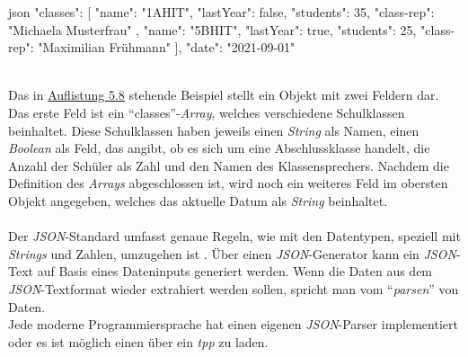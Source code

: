 		\begin{code}{json}
		{
			"classes": [
				{
					"name": "1AHIT",
					"lastYear": false,
					"students": 35,
					"class-rep": "Michaela Musterfrau"
				},
				{
					"name": "5BHIT",
					"lastYear": true,
					"students": 25,
					"class-rep": "Maximilian Frühmann"
				}
			],
			"date": "2021-09-01"
		}
		\end{code}
		\label{code:json}~\\
		Das in \hyperref[code:json]{Auflistung 5.8} stehende Beispiel stellt ein Objekt mit zwei Feldern dar. Das erste Feld ist ein \enquote{classes}-\textit{Array}, welches verschiedene Schulklassen beinhaltet. Diese Schulklassen haben jeweils einen \textit{String} als Namen, einen \textit{Boolean} als Feld, das angibt, ob es sich um eine Abschlussklasse handelt, die Anzahl der Schüler als Zahl und den Namen des Klassensprechers. Nachdem die Definition des \textit{Arrays} abgeschlossen ist, wird noch ein weiteres Feld im obersten Objekt angegeben, welches das aktuelle Datum als \textit{String} beinhaltet.
		\\~\\
		Der \textit{JSON}-Standard umfasst genaue Regeln, wie mit den Datentypen, speziell mit \textit{Strings} und Zahlen, umzugehen ist \cite{rfc4627}.
		Über einen \textit{JSON}-Generator kann ein \textit{JSON}-Text auf Basis eines Dateninputs generiert werden. Wenn die Daten aus dem \textit{JSON}-Textformat wieder extrahiert werden sollen, spricht man vom \enquote{\textit{parsen}} von Daten.\\
		Jede moderne Programmiersprache hat einen eigenen \textit{JSON}-Parser implementiert oder es ist möglich einen über ein \textit{\Gls{tpp}} zu laden.
